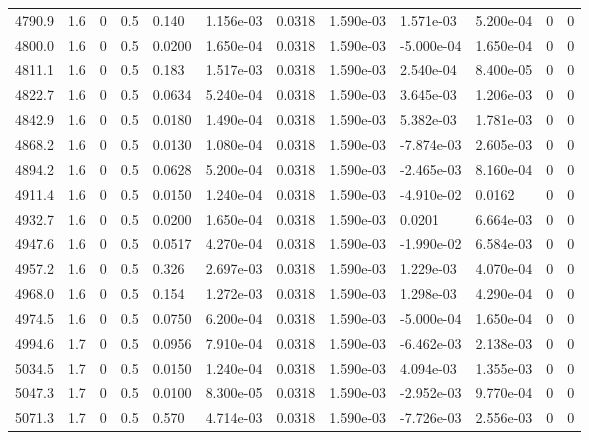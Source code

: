 \documentclass[preview]{standalone}
\begin{document}
{{{{{{{{{{\begin{tabular}{L{1.2cm}C{1.2cm} C{0.3cm}C{0.5cm} C{1.4cm}C{1.4cm} C{1.4cm}C{1.4cm} C{1.6cm}C{1.6cm} C{1.6cm}C{1.6cm}}
  4790.9  &   1.6  & 0     & 0.5 &  0.140  & 1.156e-03  &  0.0318&   1.590e-03& 1.571e-03 & 5.200e-04   &  0 & 0  \\ 
  4800.0  &   1.6  & 0     & 0.5 &  0.0200  & 1.650e-04  &  0.0318&   1.590e-03& -5.000e-04 & 1.650e-04   &  0 & 0  \\ 
  4811.1  &   1.6  & 0     & 0.5 &  0.183  & 1.517e-03  &  0.0318&   1.590e-03& 2.540e-04 & 8.400e-05   &  0 & 0  \\ 
  4822.7  &   1.6  & 0     & 0.5 &  0.0634  & 5.240e-04  &  0.0318&   1.590e-03& 3.645e-03 & 1.206e-03   &  0 & 0  \\ 
  4842.9  &   1.6  & 0     & 0.5 &  0.0180  & 1.490e-04  &  0.0318&   1.590e-03& 5.382e-03 & 1.781e-03   &  0 & 0  \\ 
  4868.2  &   1.6  & 0     & 0.5 &  0.0130  & 1.080e-04  &  0.0318&   1.590e-03& -7.874e-03 & 2.605e-03   &  0 & 0  \\ 
  4894.2  &   1.6  & 0     & 0.5 &  0.0628  & 5.200e-04  &  0.0318&   1.590e-03& -2.465e-03 & 8.160e-04   &  0 & 0  \\ 
  4911.4  &   1.6  & 0     & 0.5 &  0.0150  & 1.240e-04  &  0.0318&   1.590e-03& -4.910e-02 & 0.0162   &  0 & 0  \\ 
  4932.7  &   1.6  & 0     & 0.5 &  0.0200  & 1.650e-04  &  0.0318&   1.590e-03& 0.0201 & 6.664e-03   &  0 & 0  \\ 
  4947.6  &   1.6  & 0     & 0.5 &  0.0517  & 4.270e-04  &  0.0318&   1.590e-03& -1.990e-02 & 6.584e-03   &  0 & 0  \\ 
  4957.2  &   1.6  & 0     & 0.5 &  0.326  & 2.697e-03  &  0.0318&   1.590e-03& 1.229e-03 & 4.070e-04   &  0 & 0  \\ 
  4968.0  &   1.6  & 0     & 0.5 &  0.154  & 1.272e-03  &  0.0318&   1.590e-03& 1.298e-03 & 4.290e-04   &  0 & 0  \\ 
  4974.5  &   1.6  & 0     & 0.5 &  0.0750  & 6.200e-04  &  0.0318&   1.590e-03& -5.000e-04 & 1.650e-04   &  0 & 0  \\ 
  4994.6  &   1.7  & 0     & 0.5 &  0.0956  & 7.910e-04  &  0.0318&   1.590e-03& -6.462e-03 & 2.138e-03   &  0 & 0  \\ 
  5034.5  &   1.7  & 0     & 0.5 &  0.0150  & 1.240e-04  &  0.0318&   1.590e-03& 4.094e-03 & 1.355e-03   &  0 & 0  \\ 
  5047.3  &   1.7  & 0     & 0.5 &  0.0100  & 8.300e-05  &  0.0318&   1.590e-03& -2.952e-03 & 9.770e-04   &  0 & 0  \\ 
  5071.3  &   1.7  & 0     & 0.5 &  0.570  & 4.714e-03  &  0.0318&   1.590e-03& -7.726e-03 & 2.556e-03   &  0 & 0  \\ 

\end{tabular}}}}}}}}}}}
\end{document}
